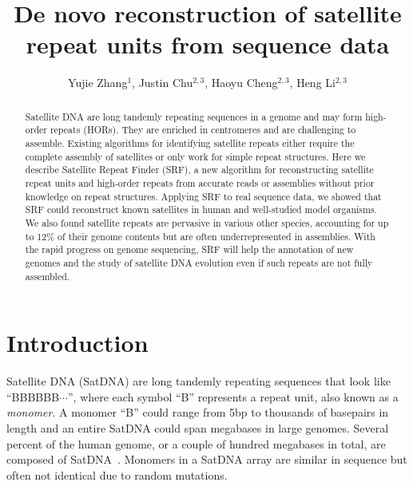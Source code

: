\documentclass{bioinfo}
\begin{document}

\title[Satellite repeat finder]{De novo reconstruction of satellite repeat units from sequence data}
\author[Li]{Yujie Zhang$^1$, Justin Chu$^{2,3}$, Haoyu Cheng$^{2,3}$, Heng Li$^{2,3}$}
\address{$^1$Harvard School of Public Health, 677 Huntington Avenue, Boston, MA 02115, USA,
$^2$Department of Data Science, Dana-Farber Cancer Institute, 450 Brookline Ave, Boston, MA 02215, USA,
$^3$Department of Biomedical Informatics, Harvard Medical School, 10 Shattuck St, Boston, MA 02115, USA}

\maketitle

\begin{abstract}
Satellite DNA are long tandemly repeating sequences in a genome and may form
high-order repeats (HORs). They are enriched in centromeres and are
challenging to assemble. Existing algorithms for identifying satellite repeats
either require the complete assembly of satellites or only work for simple
repeat structures. Here we describe Satellite Repeat Finder (SRF), a new
algorithm for reconstructing satellite repeat units and high-order repeats from
accurate reads or assemblies without prior knowledge on repeat structures.
Applying SRF to real sequence data, we showed that SRF could reconstruct known
satellites in human and well-studied model organisms. We also found satellite
repeats are pervasive in various other species, accounting for up to 12\% of
their genome contents but are often underrepresented in assemblies. With the
rapid progress on genome sequencing, SRF will help the annotation of new
genomes and the study of satellite DNA evolution even if such repeats are not
fully assembled.
\end{abstract}

\section{Introduction}

Satellite DNA (SatDNA) are long tandemly repeating sequences that look like
``{\sf BBBBBB$\cdots$}'', where each symbol ``{\sf B}'' represents a
repeat unit, also known as a \emph{monomer}. A monomer ``{\sf B}'' could range
from 5bp to thousands of basepairs in length and an entire SatDNA could span
megabases in large genomes. Several percent of the human genome, or a couple of
hundred megabases in total, are composed of SatDNA~\citep{Altemose:2022tv}.
Monomers in a SatDNA array are similar in sequence but often not identical due
to random mutations.
\end{document}
